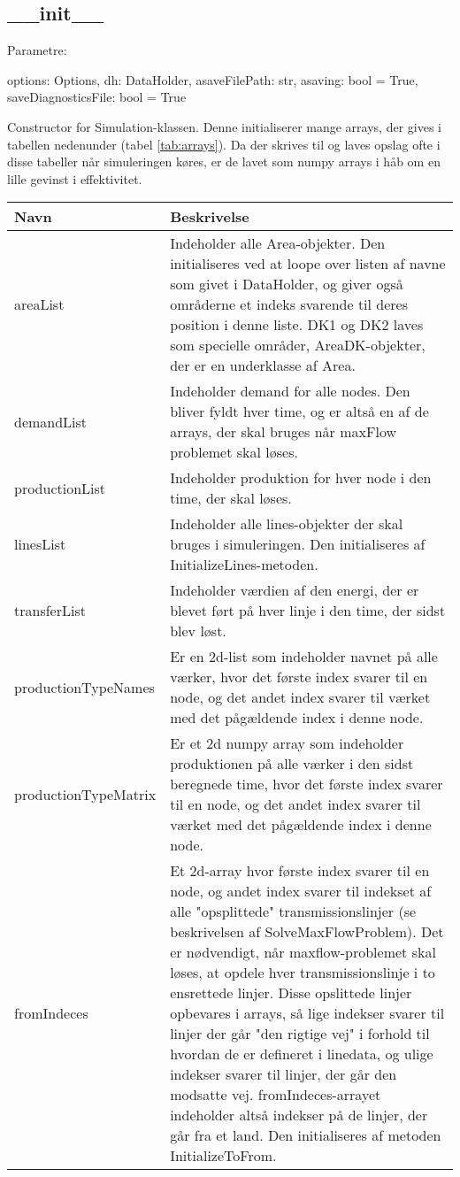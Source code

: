 \documentclass{article}
\begin{document}
\subsection{\_\_init\_\_}
Parametre: 
\begin{spverbatim}
  options: Options, dh: DataHolder, asaveFilePath: str, asaving: bool = True, saveDiagnosticsFile: bool = True
\end{spverbatim}
Constructor for Simulation-klassen. Denne initialiserer mange arrays, der gives i tabellen nedenunder (tabel \ref{tab:arrays}). Da der skrives til og laves opslag ofte i disse tabeller når simuleringen køres, er de lavet som numpy arrays i håb om en lille gevinst i effektivitet. 
\begin{table}
\centering
    \begin{tabularx}{\textwidth}{lX}
    \toprule
    Navn     & Beskrivelse \\
    \midrule
    areaList & Indeholder alle Area-objekter. Den initialiseres ved at loope over listen af navne som givet i DataHolder, og giver også områderne et indeks svarende til deres position i denne liste. DK1 og DK2 laves som specielle områder, AreaDK-objekter, der er en underklasse af Area. \\ 
    demandList & Indeholder demand for alle nodes. Den bliver fyldt hver time, og er altså en af de arrays, der skal bruges når maxFlow problemet skal løses. \\
    productionList & Indeholder produktion for hver node i den time, der skal løses. \\
    linesList & Indeholder alle lines-objekter der skal bruges i simuleringen. Den initialiseres af InitializeLines-metoden. \\
    transferList & Indeholder værdien af den energi, der er blevet ført på hver linje i den time, der sidst blev løst. \\
    productionTypeNames & Er en 2d-list som indeholder navnet på alle værker, hvor det første index svarer til en node, og det andet index svarer til værket med det pågældende index i denne node.\\
    productionTypeMatrix & Er et 2d numpy array som indeholder produktionen på alle værker i den sidst beregnede time, hvor det første index svarer til en node, og det andet index svarer til værket med det pågældende index i denne node.\\
    fromIndeces & Et 2d-array hvor første index svarer til en node, og andet index svarer til indekset af alle "opsplittede" transmissionslinjer (se beskrivelsen af SolveMaxFlowProblem). Det er nødvendigt, når maxflow-problemet skal løses, at opdele hver transmissionslinje i to ensrettede linjer. Disse opslittede linjer opbevares i arrays, så lige indekser svarer til linjer der går "den rigtige vej" i forhold til hvordan de er defineret i linedata, og ulige indekser svarer til linjer, der går den modsatte vej. fromIndeces-arrayet indeholder altså indekser på de linjer, der går fra et land. Den initialiseres af metoden InitializeToFrom.\\

\end{tabularx}
\end{table}
\end{document}

